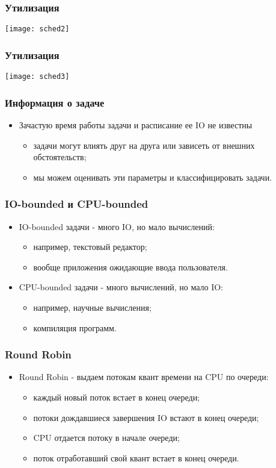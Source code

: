 \begin{frame}
\frametitle{Утилизация}
\texttt{[image: sched2]}
\end{frame}

\begin{frame}
\frametitle{Утилизация}
\texttt{[image: sched3]}
\end{frame}

\begin{frame}
\frametitle{Информация о задаче}
\begin{itemize}
    \item<1->Зачастую время работы задачи и расписание ее IO не известны
    \begin{itemize}
        \item<2->задачи могут влиять друг на друга или зависеть от внешних
             обстоятельств;
        \item<3->мы можем оценивать эти параметры и классифицировать задачи.
    \end{itemize}
\end{itemize}
\end{frame}

\begin{frame}
\frametitle{IO-bounded и CPU-bounded}
\begin{itemize}
    \item<1->IO-bounded задачи - много IO, но мало вычислений:
    \begin{itemize}
        \item<2->например, текстовый редактор;
        \item<2->вообще приложения ожидающие ввода пользователя.
    \end{itemize}
    \item<3->CPU-bounded задачи - много вычислений, но мало IO:
    \begin{itemize}
        \item<4->например, научные вычисления;
        \item<4->компиляция программ.
    \end{itemize}
\end{itemize}
\end{frame}

\begin{frame}
\frametitle{Round Robin}
\begin{itemize}
    \item<1->Round Robin - выдаем потокам квант времени на CPU по очереди:
    \begin{itemize}
        \item<2->каждый новый поток встает в конец очереди;
        \item<3->потоки дождавшиеся завершения IO встают в конец очереди;
        \item<4->CPU отдается потоку в начале очереди;
        \item<5->поток отработавший свой квант встает в конец очереди.
    \end{itemize}
\end{itemize}
\end{frame}

